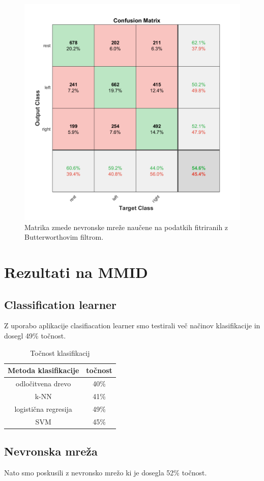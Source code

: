     \begin{figure}[h!]
    \begin{center}
    \includegraphics[width=0.5\linewidth]{slike/Confusion_my.png}
    \end{center}
    \caption{Matrika zmede nevronske mreže naučene na podatkih fitriranih z Butterworthovim filtrom.}
    \end{figure}


\newpage
\section{Rezultati na MMID}
\subsection{Classification learner}
Z uporabo aplikacije clasifiacation learner smo testirali več načinov klasifikacije in dosegl 49\% točnost. 
\begin{table}[h]
\centering
\begin{tabular}{|c|c|}
\hline
Metoda klasifikacije & točnost \\
\hline
odločitvena drevo & 40\%  \\
\hline
k-NN & 41\% \\
\hline
logistična regresija & 49\% \\
\hline
SVM & 45\% \\
\hline
\end{tabular}
\caption{Točnost klasifikacij}
\end{table}

\subsection{Nevronska mreža}
Nato smo poskusili z nevronsko mrežo ki je dosegla 52\% točnost.

